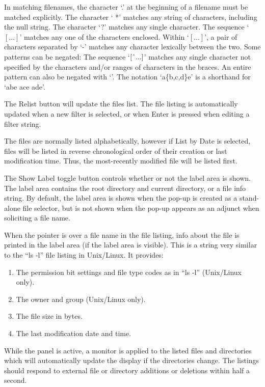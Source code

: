 In matching filenames, the character `{\vt .}' at the beginning of a
filename must be matched explicitly.  The character `{\vt
*}' matches any string of characters, including the null string.  The
character `{\vt ?}' matches any single character.  The sequence
`$[...]$' matches any one of the characters enclosed.  Within
`$[...]$', a pair of characters separated by `{\vt -}' matches any
character lexically between the two.  Some patterns can be negated:
The sequence `$[\symbol{94}...]$' matches any single character not
specified by the characters and/or ranges of characters in the braces.
An entire pattern can also be negated with `{\vt {}}'.  The
notation `{\vt a\{b,c,d\}e}' is a shorthand for `{\vt abe ace ade}'.

The {\cb Relist} button will update the files list.  The file listing
is automatically updated when a new filter is selected, or when {\kb
Enter} is pressed when editing a filter string.

The files are normally listed alphabetically, however if {\cb List by
Date} is selected, files will be listed in reverse chronological order
of their creation or last modification time.  Thus, the most-recently
modified file will be listed first.

The {\cb Show Label} toggle button controls whether or not the label
area is shown.  The label area contains the root directory and current
directory, or a file info string.  By default, the label area is shown
when the pop-up is created as a stand-alone file selector, but is not
shown when the pop-up appears as an adjunct when soliciting a file
name.

When the pointer is over a file name in the file listing, info about
the file is printed in the label area (if the label area is visible).
This is a string very similar to the ``{\vt ls -l}'' file listing in
Unix/Linux.  It provides:

\begin{enumerate}
\item{The permission bit settings and file type codes as in
  ``{\vt ls -l}'' (Unix/Linux only).}
\item{The owner and group (Unix/Linux only).}
\item{The file size in bytes.}
\item{The last modification date and time.}
\end{enumerate}

While the panel is active, a monitor is applied to the listed files
and directories which will automatically update the display if the
directories change.  The listings should respond to external file or
directory additions or deletions within half a second.


